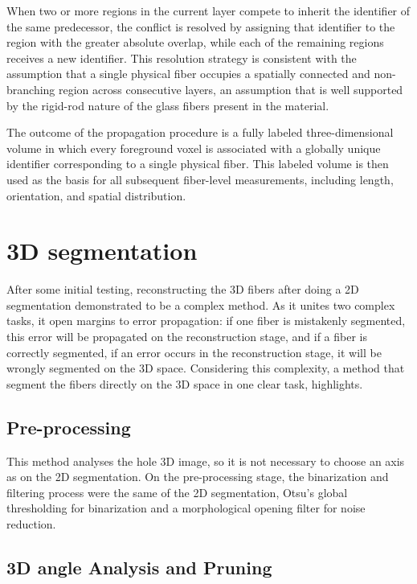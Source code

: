 When two or more regions in the current layer compete to inherit the identifier of the same predecessor, the conflict is resolved by assigning that identifier to the region with the greater absolute overlap, while each of the remaining regions receives a new identifier. This resolution strategy is consistent with the assumption that a single physical fiber occupies a spatially connected and non-branching region across consecutive layers, an assumption that is well supported by the rigid-rod nature of the glass fibers present in the material.

The outcome of the propagation procedure is a fully labeled three-dimensional volume in which every foreground voxel is associated with a globally unique identifier corresponding to a single physical fiber. This labeled volume is then used as the basis for all subsequent fiber-level measurements, including length, orientation, and spatial distribution.

\section{3D segmentation}
\label{method2}

After some initial testing, reconstructing the 3D fibers after doing a 2D segmentation demonstrated to be a complex method. As it unites two complex tasks, it open margins to error propagation: if one fiber is mistakenly segmented, this error will be propagated on the reconstruction stage, and if a fiber is correctly segmented, if an error occurs in the reconstruction stage, it will be wrongly segmented on the 3D space. Considering this complexity, a method that segment the fibers directly on the 3D space in one clear task, highlights.

\subsection{Pre-processing}

This method analyses the hole 3D image, so it is not necessary to choose an axis as on the 2D segmentation. On the pre-processing stage, the binarization and filtering process were the same of the 2D segmentation, Otsu's global thresholding for binarization and a morphological opening filter for noise reduction.

\subsection{3D angle Analysis and Pruning}

